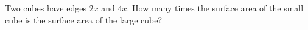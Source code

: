 Two cubes have edges $2x$ and $4x$. How many times the surface area of the small cube is the surface area of the large cube?
